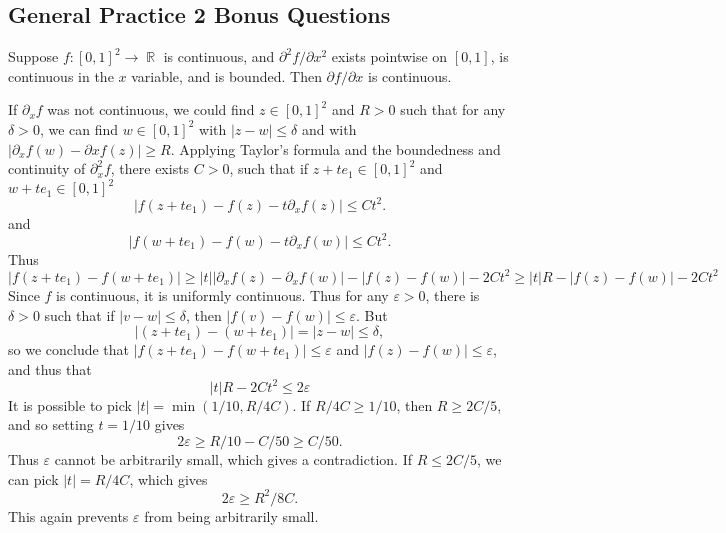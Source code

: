 \documentclass[answers]{exam}
\DeclareMathOperator{\RR}{\mathbb{R}}
\begin{document}
\begin{questions}
\newpage
\section{General Practice 2 Bonus Questions}

\question Suppose $f: [0,1]^2 \to \RR$ is continuous, and $\partial^2 f / \partial x^2$ exists pointwise on $[0,1]$, is continuous in the $x$ variable, and is bounded. Then $\partial f / \partial x$ is continuous.
\begin{solution}
	If $\partial_x f$ was not continuous, we could find $z \in [0,1]^2$ and $R > 0$ such that for any $\delta > 0$, we can find $w \in [0,1]^2$ with $|z - w| \leq \delta$ and with $| \partial_x f(w) - \partial x f(z)| \geq R$. Applying Taylor's formula and the boundedness and continuity of $\partial_x^2 f$, there exists $C > 0$, such that if $z + te_1 \in [0,1]^2$ and $w + te_1 \in [0,1]^2$
	\[ |f(z + t e_1) - f(z) - t \partial_x f(z)| \leq C t^2. \]
	and
	\[ |f(w + te_1) - f(w) - t \partial_x f(w)| \leq C t^2. \]
	Thus
	\[ |f(z + t e_1) - f(w + te_1)| \geq |t| |\partial_x f(z) - \partial_x f(w)| - |f(z) - f(w)| - 2Ct^2 \geq |t| R - |f(z) - f(w)| - 2Ct^2 \]
	Since $f$ is continuous, it is uniformly continuous. Thus for any $\varepsilon > 0$, there is $\delta > 0$ such that if $|v - w| \leq \delta$, then $|f(v) - f(w)| \leq \varepsilon$. But
	\[ |(z + te_1) - (w + te_1)| = |z - w| \leq \delta, \]
	so we conclude that $|f(z + te_1) - f(w + te_1)| \leq \varepsilon$ and $|f(z) - f(w)| \leq \varepsilon$, and thus that
	\[ |t| R - 2Ct^2 \leq 2 \varepsilon \]
	It is possible to pick $|t| = \min(1/10, R/4C)$. If $R/4C \geq 1/10$, then $R \geq 2C/5$, and so setting $t = 1/10$ gives
	\[ 2 \varepsilon \geq R/10 - C/50 \geq C/50. \]
	Thus $\varepsilon$ cannot be arbitrarily small, which gives a contradiction. If $R \leq 2C/5$, we can pick $|t| = R/4C$, which gives
	\[ 2 \varepsilon \geq R^2/8C. \]
	This again prevents $\varepsilon$ from being arbitrarily small.
\end{solution}


\end{questions}
\end{document}
